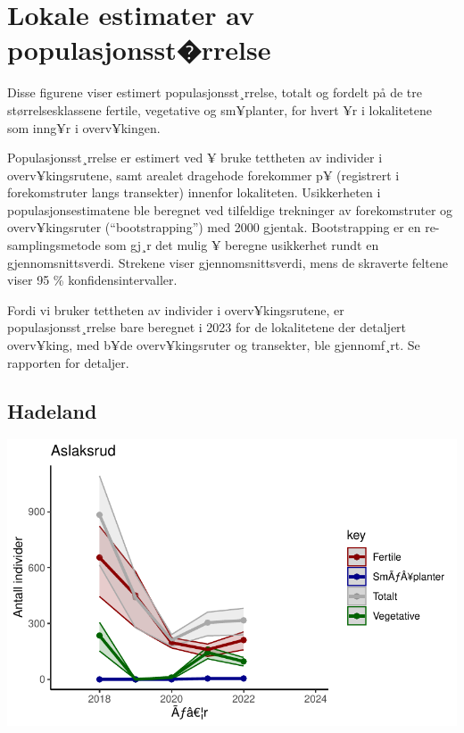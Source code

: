 \documentclass[
  letterpaper,
  DIV=11,
  numbers=noendperiod]{scrreport}
\begin{document}

\hypertarget{lokale-estimater-av-populasjonsstrrelse}{%
\chapter{Lokale estimater av
populasjonsst�rrelse}\label{lokale-estimater-av-populasjonsstrrelse}}

Disse figurene viser estimert populasjonsst¸rrelse, totalt og fordelt på
de tre størrelsesklassene fertile, vegetative og sm¥planter, for hvert
¥r i lokalitetene som inng¥r i overv¥kingen.

Populasjonsst¸rrelse er estimert ved ¥ bruke tettheten av individer i
overv¥kingsrutene, samt arealet dragehode forekommer p¥ (registrert i
forekomstruter langs transekter) innenfor lokaliteten. Usikkerheten i
populasjonsestimatene ble beregnet ved tilfeldige trekninger av
forekomstruter og overv¥kingsruter (``bootstrapping'') med 2000 gjentak.
Bootstrapping er en re-samplingsmetode som gj¸r det mulig ¥ beregne
usikkerhet rundt en gjennomsnittsverdi. Strekene viser
gjennomsnittsverdi, mens de skraverte feltene viser 95 \%
konfidensintervaller.

Fordi vi bruker tettheten av individer i overv¥kingsrutene, er
populasjonsst¸rrelse bare beregnet i 2023 for de lokalitetene der
detaljert overv¥king, med b¥de overv¥kingsruter og transekter, ble
gjennomf¸rt. Se rapporten for detaljer.

\hypertarget{hadeland}{%
\section{Hadeland}\label{hadeland}}

\includegraphics{localEst_files/figure-pdf/unnamed-chunk-3-1.pdf}
\end{document}
